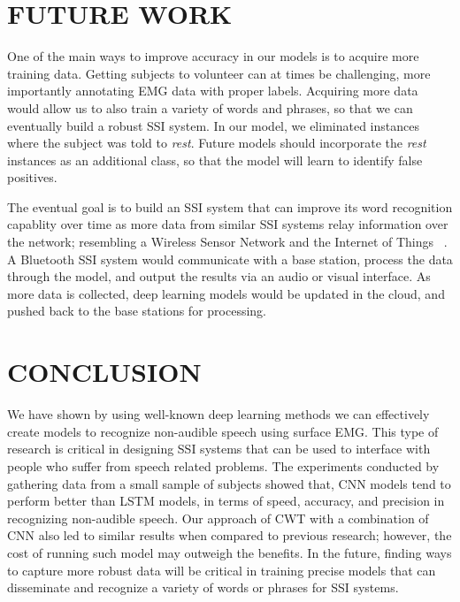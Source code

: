 \documentclass{article}
\begin{document}

\section{FUTURE WORK}
\label{sec:FUTURE WORK}

One of the main ways to improve accuracy in our models is to acquire more training data. Getting subjects to volunteer can at times be challenging, more importantly annotating EMG data with proper labels. Acquiring more data would allow us to also train a variety of words and phrases, so that we can eventually build a robust SSI system. In our model, we eliminated instances where the subject was told to \textit{rest}. Future models should incorporate the \textit{rest} instances as an additional class, so that the model will learn to identify false positives.

The eventual goal is to build an SSI system that can improve its word recognition capablity over time as more data from similar SSI systems relay information over the network; resembling a Wireless Sensor Network and the Internet of Things ~\cite{ferdoush_wireless_2014}. A Bluetooth SSI system would communicate with a base station, process the data through the model, and output the results via an audio or visual interface. As more data is collected, deep learning models would be updated in the cloud, and pushed back to the base stations for processing.

\section{CONCLUSION}
\label{sec:CONCLUSION}

We have shown by using well-known deep learning methods we can effectively create models to recognize non-audible speech using surface EMG. This type of research is critical in designing SSI systems that can be used to interface with people who suffer from speech related problems. The experiments conducted by gathering data from a small sample of subjects showed that, CNN models tend to perform better than LSTM models, in terms of speed, accuracy, and precision in recognizing non-audible speech. Our approach of CWT with a combination of CNN also led to similar results when compared to previous research; however, the cost of running such model may outweigh the benefits. In the future, finding ways to capture more robust data will be critical in training precise models that can disseminate and recognize a variety of words or phrases for SSI systems.



\end{document}
